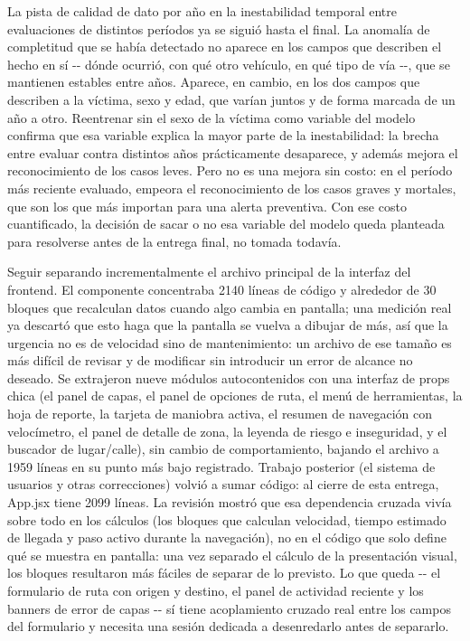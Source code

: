 La pista de calidad de dato por año en la inestabilidad temporal entre
evaluaciones de distintos períodos ya se siguió hasta el final. La
anomalía de completitud que se había detectado no aparece en los campos
que describen el hecho en sí -\/- dónde ocurrió, con qué otro vehículo,
en qué tipo de vía -\/-, que se mantienen estables entre años. Aparece,
en cambio, en los dos campos que describen a la víctima, sexo y edad,
que varían juntos y de forma marcada de un año a otro. Reentrenar sin el
sexo de la víctima como variable del modelo confirma que esa variable
explica la mayor parte de la inestabilidad: la brecha entre evaluar
contra distintos años prácticamente desaparece, y además mejora el
reconocimiento de los casos leves. Pero no es una mejora sin costo: en
el período más reciente evaluado, empeora el reconocimiento de los casos
graves y mortales, que son los que más importan para una alerta
preventiva. Con ese costo cuantificado, la decisión de sacar o no esa
variable del modelo queda planteada para resolverse antes de la entrega
final, no tomada todavía.

Seguir separando incrementalmente el archivo principal de la interfaz
del frontend. El componente concentraba 2140 líneas de código y
alrededor de 30 bloques que recalculan datos cuando algo cambia en
pantalla; una medición real ya descartó que esto haga que la pantalla se
vuelva a dibujar de más, así que la urgencia no es de velocidad sino de
mantenimiento: un archivo de ese tamaño es más difícil de revisar y de
modificar sin introducir un error de alcance no deseado. Se extrajeron
nueve módulos autocontenidos con una interfaz de props chica (el panel
de capas, el panel de opciones de ruta, el menú de herramientas, la hoja
de reporte, la tarjeta de maniobra activa, el resumen de navegación con
velocímetro, el panel de detalle de zona, la leyenda de riesgo e
inseguridad, y el buscador de lugar/calle), sin cambio de
comportamiento, bajando el archivo a 1959 líneas en su punto más bajo
registrado. Trabajo posterior (el sistema de usuarios y otras
correcciones) volvió a sumar código: al cierre de esta entrega, App.jsx
tiene 2099 líneas. La revisión mostró que esa dependencia cruzada vivía
sobre todo en los cálculos (los bloques que calculan velocidad, tiempo
estimado de llegada y paso activo durante la navegación), no en el
código que solo define qué se muestra en pantalla: una vez separado el
cálculo de la presentación visual, los bloques resultaron más fáciles de
separar de lo previsto. Lo que queda -\/- el formulario de ruta con
origen y destino, el panel de actividad reciente y los banners de error
de capas -\/- sí tiene acoplamiento cruzado real entre los campos del
formulario y necesita una sesión dedicada a desenredarlo antes de
separarlo.

